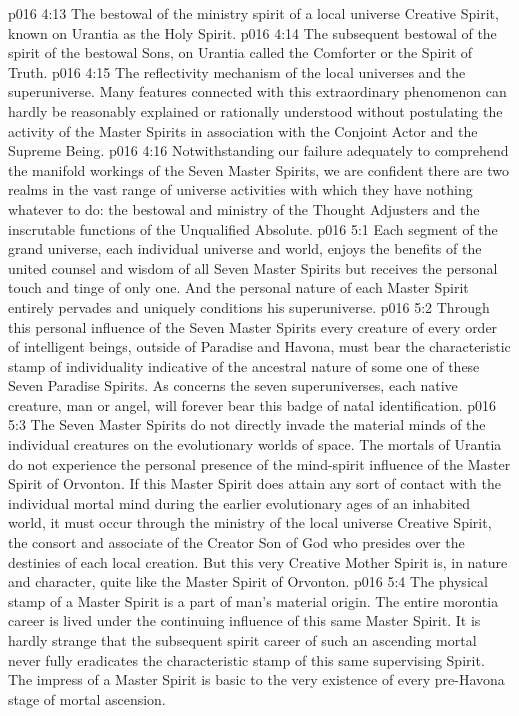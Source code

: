 \vs p016 4:13 \bibnobreakspace The bestowal of the ministry spirit of a local universe Creative Spirit, known on Urantia as the Holy Spirit.
\vs p016 4:14 \bibnobreakspace The subsequent bestowal of the spirit of the bestowal Sons, on Urantia called the Comforter or the Spirit of Truth.
\vs p016 4:15 \bibnobreakspace The reflectivity mechanism of the local universes and the superuniverse. Many features connected with this extraordinary phenomenon can hardly be reasonably explained or rationally understood without postulating the activity of the Master Spirits in association with the Conjoint Actor and the Supreme Being.
\pc \vs p016 4:16 Notwithstanding our failure adequately to comprehend the manifold workings of the Seven Master Spirits, we are confident there are two realms in the vast range of universe activities with which they have nothing whatever to do: the bestowal and ministry of the Thought Adjusters and the inscrutable functions of the Unqualified Absolute.
\vs p016 5:1 Each segment of the grand universe, each individual universe and world, enjoys the benefits of the united counsel and wisdom of all Seven Master Spirits but receives the personal touch and tinge of only one. And the personal nature of each Master Spirit entirely pervades and uniquely conditions his superuniverse.
\vs p016 5:2 Through this personal influence of the Seven Master Spirits every creature of every order of intelligent beings, outside of Paradise and Havona, must bear the characteristic stamp of individuality indicative of the ancestral nature of some one of these Seven Paradise Spirits. As concerns the seven superuniverses, each native creature, man or angel, will forever bear this badge of natal identification.
\vs p016 5:3 The Seven Master Spirits do not directly invade the material minds of the individual creatures on the evolutionary worlds of space. The mortals of Urantia do not experience the personal presence of the mind\hyp{}spirit influence of the Master Spirit of Orvonton. If this Master Spirit does attain any sort of contact with the individual mortal mind during the earlier evolutionary ages of an inhabited world, it must occur through the ministry of the local universe Creative Spirit, the consort and associate of the Creator Son of God who presides over the destinies of each local creation. But this very Creative Mother Spirit is, in nature and character, quite like the Master Spirit of Orvonton.
\vs p016 5:4 The physical stamp of a Master Spirit is a part of man’s material origin. The entire morontia career is lived under the continuing influence of this same Master Spirit. It is hardly strange that the subsequent spirit career of such an ascending mortal never fully eradicates the characteristic stamp of this same supervising Spirit. The impress of a Master Spirit is basic to the very existence of every pre\hyp{}Havona stage of mortal ascension.
